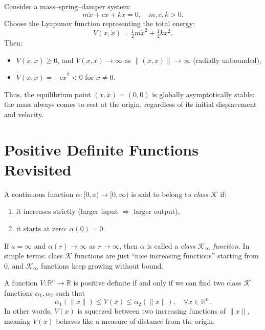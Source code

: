 \begin{example}
	Consider a mass--spring--damper system:
	\begin{equation}
		m\ddot{x} + c\dot{x} + kx = 0, \quad m,c,k>0.
	\end{equation}
	Choose the Lyapunov function representing the total energy:
	\begin{equation}
		V(x,\dot{x}) = \tfrac{1}{2}m\dot{x}^2 + \tfrac{1}{2}kx^2.
	\end{equation}
	Then:
	\begin{itemize}
		\item $V(x,\dot{x}) \ge 0$, and $V(x,\dot{x}) \to \infty$ as $\|(x,\dot{x})\|\to \infty$ (radially unbounded),
		\item $\dot{V}(x,\dot{x}) = -c\dot{x}^2 < 0$ for $\dot{x}\neq 0$.
	\end{itemize}
	Thus, the equilibrium point $(x,\dot{x})=(0,0)$ is globally asymptotically stable:  
	the mass always comes to rest at the origin, regardless of its initial displacement and velocity.
\end{example}

\newpage
\section{Positive Definite Functions Revisited}

\begin{definition}
	A continuous function $\alpha:[0,a)\to [0,\infty)$ is said to belong to \emph{class $\mathcal{K}$} if:
	\begin{enumerate}
		\item it increases strictly (larger input $\Rightarrow$ larger output),
		\item it starts at zero: $\alpha(0)=0$.
	\end{enumerate}
	If $a=\infty$ and $\alpha(r)\to \infty$ as $r\to \infty$, then $\alpha$ is called a \emph{class $\mathcal{K}_\infty$ function}.  
	In simple terms: class $\mathcal{K}$ functions are just ``nice increasing functions'' starting from $0$, and $\mathcal{K}_\infty$ functions keep growing without bound.
\end{definition}

\begin{corollary}
	A function $V:\mathbb{R}^n \to \mathbb{R}$ is positive definite if and only if we can find two class $\mathcal{K}$ functions $\alpha_1, \alpha_2$ such that
	\begin{equation}
		\alpha_1(\|x\|) \leq V(x) \leq \alpha_2(\|x\|), \quad \forall x \in \mathbb{R}^n.
	\end{equation}
	In other words, $V(x)$ is squeezed between two increasing functions of $\|x\|$, meaning $V(x)$ behaves like a measure of distance from the origin.
\end{corollary}

